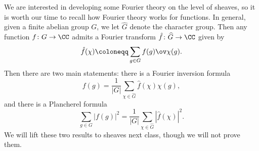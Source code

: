 \documentclass[../notes.tex]{subfiles}
\begin{document}
We are interested in developing some Fourier theory on the level of sheaves, so it is worth our time to recall how Fourier theory works for functions. In general, given a finite abelian group $G$, we let $\widehat G$ denote the character group. Then any function $f\colon G\to\CC$ admits a Fourier transform $\hat f\colon\widehat G\to\CC$ given by
\[\hat f(\chi)\coloneqq\sum_{g\in G}f(g)\ov\chi(g).\]
Then there are two main statements: there is a Fourier inversion formula
\[f(g)=\frac1{\left|G\right|}\sum_{\chi\in\widehat G}\hat f(\chi)\chi(g),\]
and there is a Plancherel formula
\[\sum_{g\in G}\left|f(g)\right|^2=\frac1{\left|G\right|}\sum_{\chi\in\widehat G}\left|\hat f(\chi)\right|^2.\]
We will lift these two results to sheaves next class, though we will not prove them.
\end{document}
